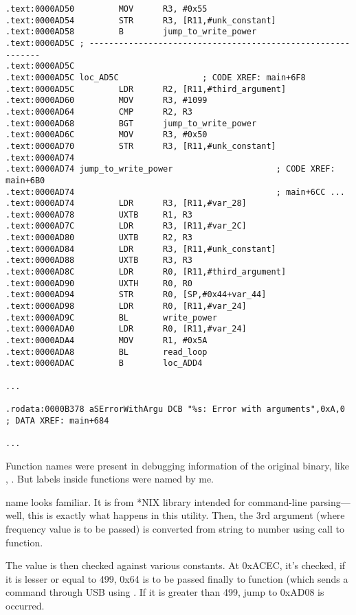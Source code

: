 \begin{lstlisting}[style=customasmARM]
.text:0000AD50         MOV      R3, #0x55
.text:0000AD54         STR      R3, [R11,#unk_constant]
.text:0000AD58         B        jump_to_write_power
.text:0000AD5C ; ------------------------------------------------------------
.text:0000AD5C
.text:0000AD5C loc_AD5C                 ; CODE XREF: main+6F8
.text:0000AD5C         LDR      R2, [R11,#third_argument]
.text:0000AD60         MOV      R3, #1099
.text:0000AD64         CMP      R2, R3
.text:0000AD68         BGT      jump_to_write_power
.text:0000AD6C         MOV      R3, #0x50
.text:0000AD70         STR      R3, [R11,#unk_constant]
.text:0000AD74
.text:0000AD74 jump_to_write_power                     ; CODE XREF: main+6B0
.text:0000AD74                                         ; main+6CC ...
.text:0000AD74         LDR      R3, [R11,#var_28]
.text:0000AD78         UXTB     R1, R3
.text:0000AD7C         LDR      R3, [R11,#var_2C]
.text:0000AD80         UXTB     R2, R3
.text:0000AD84         LDR      R3, [R11,#unk_constant]
.text:0000AD88         UXTB     R3, R3
.text:0000AD8C         LDR      R0, [R11,#third_argument]
.text:0000AD90         UXTH     R0, R0
.text:0000AD94         STR      R0, [SP,#0x44+var_44]
.text:0000AD98         LDR      R0, [R11,#var_24]
.text:0000AD9C         BL       write_power
.text:0000ADA0         LDR      R0, [R11,#var_24]
.text:0000ADA4         MOV      R1, #0x5A
.text:0000ADA8         BL       read_loop
.text:0000ADAC         B        loc_ADD4

...

.rodata:0000B378 aSErrorWithArgu DCB "%s: Error with arguments",0xA,0 ; DATA XREF: main+684

...

\end{lstlisting}

Function names were present in debugging information of the original binary, like , .
But labels inside functions were named by me.

 name looks familiar. It is from  *NIX library intended for command-line parsing---well, this is exactly what happens in this utility.
Then, the 3rd argument (where frequency value is to be passed) is converted from string to number using call to  function.

The value is then checked against various constants.
At 0xACEC, it's checked, if it is lesser or equal to 499, 0x64 is to be passed finally to  function (which sends a command through USB using .
If it is greater than 499, jump to 0xAD08 is occurred.

